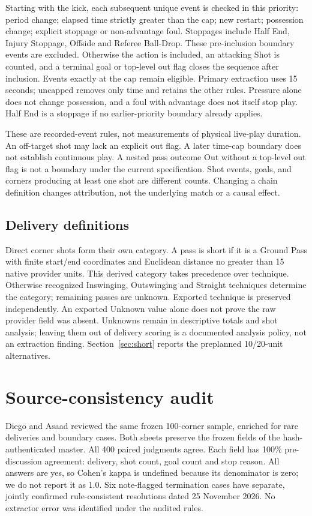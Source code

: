\documentclass[sigconf,nonacm]{acmart}
\begin{document}
Starting with the kick, each subsequent unique event is checked in this priority:
period change; elapsed time strictly greater than the cap; new restart; possession
change; explicit stoppage or non-advantage foul. Stoppages include Half End, Injury Stoppage,
Offside and Referee Ball-Drop. These pre-inclusion boundary events
are excluded. Otherwise the action is included, an attacking Shot is counted,
and a terminal goal or top-level out flag closes the sequence after inclusion.
Events exactly at the cap remain eligible. Primary extraction uses 15 seconds;
uncapped removes only time and retains the other rules. Pressure alone does not
change possession, and a foul with advantage does not itself stop play. Half End
is a stoppage if no earlier-priority boundary already applies.

These are recorded-event rules, not measurements of physical live-play duration.
An off-target shot may lack an explicit out flag. A later time-cap boundary does
not establish continuous play. A nested pass outcome Out without a
top-level out flag is not a boundary under the current specification. Shot events,
goals, and corners producing at least one shot are different counts. Changing a
chain definition changes attribution, not the underlying match or a causal effect.

\subsection{Delivery definitions}
Direct corner shots form their own category. A pass is short if it is a Ground
Pass with finite start/end coordinates and Euclidean distance no greater than
15 native provider units. This derived category takes precedence over technique.
Otherwise recognized Inswinging, Outswinging and Straight techniques determine
the category; remaining passes are unknown. Exported technique is preserved
independently. An exported Unknown value alone does not prove the raw provider
field was absent. Unknowns remain in descriptive totals and shot analysis; leaving
them out of delivery scoring is a documented analysis policy, not an extraction
finding. Section~\ref{sec:short} reports the preplanned 10/\allowbreak{}20-unit alternatives.

\section{Source-consistency audit}
Diego and Asaad reviewed the same frozen 100-corner sample, enriched for rare
deliveries and boundary cases. Both sheets preserve the frozen fields of the
hash-authenticated master. All 400 paired judgments agree. Each field has 100\%
pre-discussion agreement: delivery, shot count, goal count and stop reason.
All answers are yes, so Cohen's kappa is undefined because its denominator is
zero; we do not report it as 1.0. Six note-flagged termination cases have separate,
jointly confirmed rule-consistent resolutions dated 25 November 2026. No extractor
error was identified under the audited rules.
\end{document}
